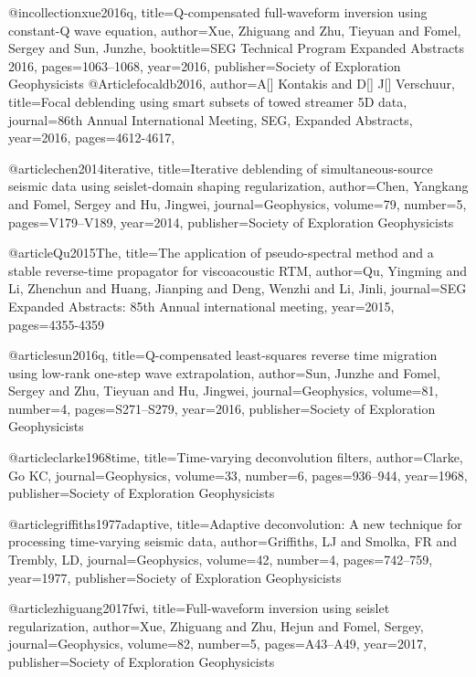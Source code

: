 @incollection{xue2016q,
  title={Q-compensated full-waveform inversion using constant-Q wave equation},
  author={Xue, Zhiguang and Zhu, Tieyuan and Fomel, Sergey and Sun, Junzhe},
  booktitle={SEG Technical Program Expanded Abstracts 2016},
  pages={1063--1068},
  year={2016},
  publisher={Society of Exploration Geophysicists}
}
@Article{focaldb2016,
  author={A[] Kontakis and D[] J[] Verschuur},
  title={Focal deblending using smart subsets of towed streamer 5{D} data},
  journal={86th Annual International Meeting, SEG, Expanded Abstracts},
  year=2016,
  pages={4612-4617},
}

@article{chen2014iterative,
  title={Iterative deblending of simultaneous-source seismic data using seislet-domain shaping regularization},
  author={Chen, Yangkang and Fomel, Sergey and Hu, Jingwei},
  journal={Geophysics},
  volume={79},
  number={5},
  pages={V179--V189},
  year={2014},
  publisher={Society of Exploration Geophysicists}
}

@article{Qu2015The,
  title={The application of pseudo-spectral method and a stable reverse-time propagator for viscoacoustic {RTM}},
  author={Qu, Yingming and Li, Zhenchun and Huang, Jianping and Deng, Wenzhi and Li, Jinli},
  journal={SEG Expanded Abstracts: 85th Annual international meeting},
  year={2015},
  pages={4355-4359}
}

@article{sun2016q,
  title={Q-compensated least-squares reverse time migration using low-rank one-step wave extrapolation},
  author={Sun, Junzhe and Fomel, Sergey and Zhu, Tieyuan and Hu, Jingwei},
  journal={Geophysics},
  volume={81},
  number={4},
  pages={S271--S279},
  year={2016},
  publisher={Society of Exploration Geophysicists}
}

@article{clarke1968time,
  title={Time-varying deconvolution filters},
  author={Clarke, Go KC},
  journal={Geophysics},
  volume={33},
  number={6},
  pages={936--944},
  year={1968},
  publisher={Society of Exploration Geophysicists}
}

@article{griffiths1977adaptive,
  title={Adaptive deconvolution: A new technique for processing time-varying seismic data},
  author={Griffiths, LJ and Smolka, FR and Trembly, LD},
  journal={Geophysics},
  volume={42},
  number={4},
  pages={742--759},
  year={1977},
  publisher={Society of Exploration Geophysicists}
}

@article{zhiguang2017fwi,
  title={Full-waveform inversion using seislet regularization},
  author={Xue, Zhiguang and Zhu, Hejun and Fomel, Sergey},
  journal={Geophysics},
  volume={82},
  number={5},
  pages={A43--A49},
  year={2017},
  publisher={Society of Exploration Geophysicists}
}

